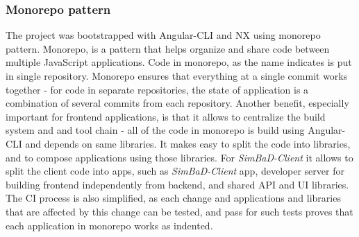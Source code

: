 \subsubsection{Monorepo pattern}
The project was bootstrapped with Angular-CLI and NX using monorepo pattern. Monorepo, is a pattern that helps organize and share code between multiple JavaScript applications. Code in monorepo, as the name indicates is put in single repository. Monorepo ensures that everything at a single commit works together - for code in separate repositories, the state of application is a combination of several commits from each repository. Another benefit, especially important for frontend applications, is that it allows to centralize the build system and and tool chain - all of the code in monorepo is build using Angular-CLI and depends on same libraries. It makes easy to split the code into libraries, and to compose applications using those libraries. For \textit{SimBaD-Client} it allows to split the client code into apps, such as \textit{SimBaD-Client} app, developer server for building frontend independently from backend, and shared API and UI libraries. The CI process is also simplified, as each change and applications and libraries that are affected by this change can be tested, and pass for such tests proves that each application in monorepo works as indented.
